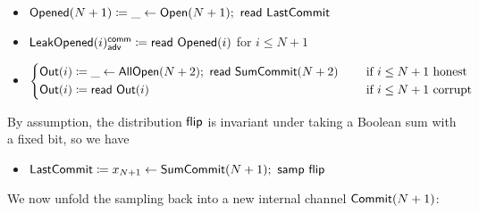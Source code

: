 \begin{itemize}
\item {\color{red} $\mathsf{Opened}(N+1) \coloneqq \_ \leftarrow \mathsf{Open}(N+1); \ \mathsf{read} \ \mathsf{LastCommit}$}
\item {\color{red} $\mathsf{LeakOpened}(i)^{\mathsf{comm}}_{\mathsf{adv}} \coloneqq \mathsf{read} \ \mathsf{Opened}(i)$ for $i \leq N+1$}
\item $\begin{cases*} \Out(i) \coloneqq \_ \leftarrow \AllOpen(N+2); \ \read{\SumCommit(N+2)} & \hspace{10pt} \text{if $i \leq N+1$ honest} \\ \Out(i) \coloneqq \read{\Out(i)} & \hspace{10pt} \text{if $i \leq N+1$ corrupt} \end{cases*}$
\end{itemize}

\noindent By assumption, the distribution $\mathsf{flip}$ is invariant under taking a Boolean sum with a fixed bit, so we have

\begin{itemize}
\item $\mathsf{LastCommit} \coloneqq x_{N+1} \leftarrow \mathsf{SumCommit}(N+1); \ \mathsf{samp} \ \mathsf{flip}$
\end{itemize}

\noindent We now unfold the sampling back into a new internal channel $\mathsf{Commit}(N+1)$:

